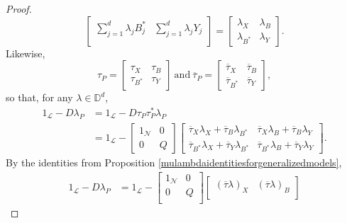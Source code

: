 \documentclass[11pt, reqno]{amsart}
\newcommand\1{\boldsymbol {1}}
\numberwithin{equation}{section}
\begin{document}
\begin{proof}
\begin{equation}
\begin{bmatrix}
        \sum_{j=1}^{d}\lambda_{j}B_{j}^{*} & \sum_{j=1}^{d}\lambda_{j}Y_{j} \\
\end{bmatrix} = \begin{bmatrix}
\lambda_{X} & \lambda_{B}\\
\lambda_{B^{*}} & \lambda_{Y}
\end{bmatrix}.
\end{equation}
Likewise, 
$$\tau_{P} = \begin{bmatrix}
\tau_{X} & \tau_{B}\\
\tau_{B^{*}} & \tau_{Y}
\end{bmatrix}~\text{and}~\overline{\tau}_{P} = \begin{bmatrix}
        \overline{\tau}_{X} & \overline{\tau}_{B}\\
        \overline{\tau}_{B^{*}} & \overline{\tau}_{Y}
        \end{bmatrix},$$
so that, for any $\lambda\in\mathbb{D}^{d}$, 
\begin{align*}
    1_{\mathcal{L}}-D\lambda_{P}  &= 1_{\mathcal{L}}-D\tau_{P}\tau_{P}^{*}\lambda_{P}\\
                &=1_{\mathcal{L}}-\begin{bmatrix}
                    1_{\mathcal{N}} & 0 \\
                    0 & Q
                    \end{bmatrix}\begin{bmatrix}
\overline{\tau}_{X}\lambda_{X}+\overline{\tau}_{B}\lambda_{B^{*}} & \overline{\tau}_{X}\lambda_{B} + \overline{\tau}_{B}\lambda_{Y}\\
\overline{\tau}_{B^{*}}\lambda_{X}+\overline{\tau}_{Y}\lambda_{B^{*}} & \overline{\tau}_{B^{*}}\lambda_{B}+\overline{\tau}_{Y}\lambda_{Y}
                    \end{bmatrix}.
\end{align*}
By the identities from Proposition \ref{mulambdaidentitiesforgeneralizedmodels},
\begin{align*}
    1_{\mathcal{L}}-D\lambda_{P} &=1_{\mathcal{L}}-\begin{bmatrix}
                    1_{\mathcal{N}} & 0 \\
                    0 & Q \\
                    \end{bmatrix}\begin{bmatrix}
                    (\overline{\tau}\lambda)_{X} & (\overline{\tau}\lambda)_{B} \\

\end{bmatrix}
\end{align*}
\end{proof}
\end{document}
